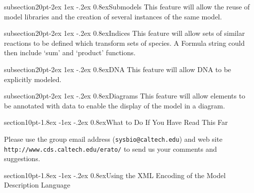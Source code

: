 \documentclass[10pt]{article}
\makeatletter
\renewcommand{\section}{\@startsection%
  {section}{1}{0pt}{-1.8ex \@plus -1ex \@minus -.2ex}%
  {0.8ex}{\normalfont\Large\bfseries}}
\renewcommand{\subsection}{\@startsection%
  {subsection}{2}{0pt}{-2ex \@plus 1ex \@minus -.2ex}%
  {0.8ex}{\slshape\large\bfseries}}
\newcommand{\url}[1]{\textup{\texttt{#1}}}
\newcommand{\eratowebloc}{\url{http://www.cds.caltech.edu/erato/}}
\makeatother
\begin{document}
\subsection{Submodels}
This feature will allow the reuse of model libraries and the
creation of several instances of the same model.

\subsection{Indices}
This feature will allow sets of similar reactions to be defined
which transform sets of species.  A Formula string could then
include `sum' and `product' functions.

\subsection{DNA}
This feature will allow DNA to be explicitly modeled.

\subsection{Diagrams}
This feature will allow elements to be annotated with data to
enable the display of the model in a diagram.

\section{What to Do If You Have Read This Far}
\label{sec:what}

Please use the group email address (\texttt{sysbio@caltech.edu})
and web site \eratowebloc{} to send us your comments and
suggestions.

\appendix

\section{Using the XML Encoding of the Model Description Language}
\label{sec:xml-rep}
\end{document}
